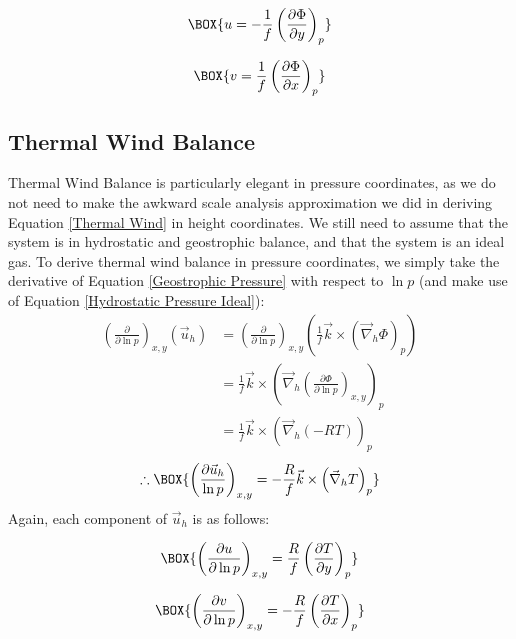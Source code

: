 \begin{minipage}{.48\linewidth}
    \begin{align*}
        \BOX{
            u = -\frac{1}{f}\left( \frac{\partial \Phi}{\partial y} \right)_p
        }
    \end{align*}
\end{minipage}
\hfill
\begin{minipage}{.48\linewidth}
    \begin{align*}
        \BOX{
            v = \frac{1}{f}\left( \frac{\partial \Phi}{\partial x} \right)_p
        }
    \end{align*}
\end{minipage}

\subsection{Thermal Wind Balance}

Thermal Wind Balance is particularly elegant in pressure coordinates, as we do not need to make the awkward scale analysis approximation we did in deriving Equation \ref{Thermal Wind} in height coordinates. We still need to assume that the system is in hydrostatic and geostrophic balance, and that the system is an ideal gas. To derive thermal wind balance in pressure coordinates, we simply take the derivative of Equation \ref{Geostrophic Pressure} with respect to $\ln p$ (and make use of Equation \ref{Hydrostatic Pressure Ideal}):
\begin{align*}
    \left( \frac{\partial}{\partial \ln p} \right)_{x,y}\left( \vec{u}_h \right)
    &= \left( \frac{\partial}{\partial \ln p} \right)_{x,y}
    \left( \frac{1}{f}\vec{k}\times\left( \vec{\nabla}_h \Phi \right)_p \right)
    \\
    &= \frac{1}{f}\vec{k}\times\left( \vec{\nabla}_h \left( \frac{\partial \Phi}{\partial \ln p} \right)_{x,y} \right)_{p}
    \\
    &= \frac{1}{f}\vec{k}\times\left( \vec{\nabla}_h (-RT) \right)_{p}
\end{align*}
\begin{align}
    \therefore
    \BOX{
        \left( \frac{\partial \vec{u}_h}{\ln p} \right)_{x,y}
        =
        -\frac{R}{f}\vec{k}\times \left( \vec{\nabla}_h T \right)_p
    }
\end{align}
Again, each component of $\vec{u}_h$ is as follows:

\begin{minipage}{.48\linewidth}
    \begin{align*}
        \BOX{
            \left( \frac{\partial u}{\partial \ln p} \right)_{x,y}
            =\frac{R}{f}
            \left( \frac{\partial T}{\partial y} \right)_{p}
        }
    \end{align*}
\end{minipage}
\hfill
\begin{minipage}{.48\linewidth}
    \begin{align*}
        \BOX{
            \left( \frac{\partial v}{\partial \ln p} \right)_{x,y}
            =-\frac{R}{f}
            \left( \frac{\partial T}{\partial x} \right)_{p}
        }
    \end{align*}
\end{minipage}

